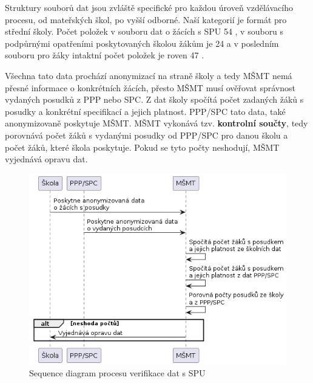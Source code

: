 \documentclass[FM,Proj]{tulthesis}
\begin{document}
Struktury souborů dat jsou zvláště specifické pro každou úroveň vzdělávacího procesu, 
od mateřských škol, po vyšší odborné. Naší kategorií je formát pro střední školy.
Počet položek v souboru dat o žácích s SPU 54 \cite{msmt-rozhrani-predavani-dat-2023},
v souboru s podpůrnými opatřeními poskytovaných školou žákům je 24 
\cite{msmt-rozhrani-predavani-dat-2023} a v posledním souboru pro žáky intaktní počet položek
je roven 47 \cite{msmt-rozhrani-predavani-dat-2023}.

Všechna tato data prochází anonymizací na straně školy a tedy MŠMT nemá přesné informace o konkrétních 
žácích, přesto MŠMT musí ověřovat správnost vydaných posudků z PPP nebo SPC. Z dat školy spočítá počet 
zadaných žáků s posudky a konkrétní specifikací a jejich platnost. PPP/SPC tato data, také anonymizovaně 
poskytuje MŠMT. MŠMT vykonává tzv. \textbf{kontrolní součty}, tedy porovnává počet žáků s vydanými posudky
od PPP/SPC pro danou školu a počet žáků, které škola poskytuje. Pokud se tyto počty neshodují, MŠMT
vyjednává opravu dat.

\begin{figure}[H]
    \includegraphics[width=\textwidth-28pt]{seq-kontrolni-soucty.png}
    \caption{Sequence diagram procesu verifikace dat s SPU}
    \label{fig:seq-kontrolni-soucty}
\end{figure}
\end{document}
